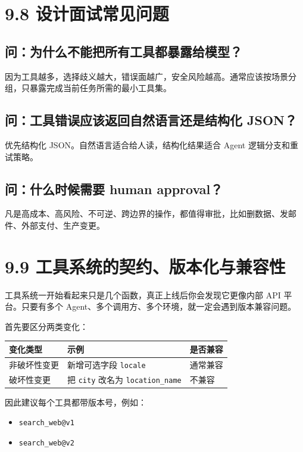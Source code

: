 \section{9.8 设计面试常见问题}

\subsection{问：为什么不能把所有工具都暴露给模型？}

因为工具越多，选择歧义越大，错误面越广，安全风险越高。通常应该按场景分组，只暴露完成当前任务所需的最小工具集。


\subsection{问：工具错误应该返回自然语言还是结构化 JSON？}

优先结构化 JSON。自然语言适合给人读，结构化结果适合 Agent 逻辑分支和重试策略。


\subsection{问：什么时候需要 human approval？}

凡是高成本、高风险、不可逆、跨边界的操作，都值得审批，比如删数据、发邮件、外部支付、生产变更。


\section{9.9 工具系统的契约、版本化与兼容性}

工具系统一开始看起来只是几个函数，真正上线后你会发现它更像内部 API 平台。只要有多个 Agent、多个调用方、多个环境，就一定会遇到版本兼容问题。


首先要区分两类变化：


\begingroup
\scriptsize
\setlength{\tabcolsep}{3pt}
\begin{longtable}{|p{}|p{}|p{}|}
\hline
变化类型 & 示例 & 是否兼容 \\ \hline
非破坏性变更 & 新增可选字段 \texttt{locale} & 通常兼容 \\ \hline
破坏性变更 & 把 \texttt{city} 改名为 \texttt{location\_name} & 不兼容 \\ \hline
\end{longtable}
\endgroup

因此建议每个工具都带版本号，例如：


\begin{itemize}[leftmargin=2em]
\item \texttt{search\_web@v1}
\item \texttt{search\_web@v2}
\end{itemize}

